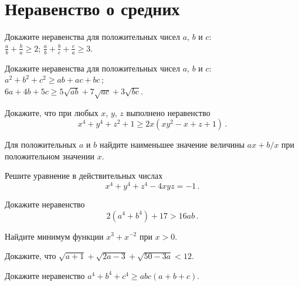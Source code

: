 
\section*{Неравенство о средних}


\begin{problems}

\item
Докажите неравенства для положительных чисел $a$, $b$ и $c$:
\\[0.5ex]
\subproblem
\( \displaystyle
    \frac{a}{b} + \frac{b}{a}
\geq
    2
\);
\qquad
\subproblem
\( \displaystyle
    \frac{a}{b} + \frac{b}{c} + \frac{c}{a}
\geq
    3
\).

\item
Докажите неравенства для положительных чисел $a$, $b$ и $c$:
\\[0.25ex]
\subproblem
\(
    a^2 + b^2 + c^2
\geq
    ab + ac + bc
\)\,;
\\[0.5ex]
\subproblem
\(
    6 a + 4 b + 5 c
\geq
    5 \sqrt{ab} + 7 \sqrt{ac} + 3 \sqrt{bc}
\).

\item
Докажите, что при любых $x$, $y$, $z$ выполнено неравенство
\[
    x^4 + y^4 + z^2 + 1
\geq
    2 x (x y^2 - x + z + 1)
\, . \]

\item
Для положительных $a$ и $b$ найдите наименьшее значение величины
$a x + b / x$
при положительном значении $x$.

\item
Решите уравнение в действительных числах
\[
    x^4 + y^4 + z^4 - 4 x y z = -1
\, . \]

\item
Докажите неравенство
\[
    2 (a^4 + b^4) + 17 > 16 a b
\, . \]


\item
Найдите минимум функции $x^3 + x^{-2}$ при $x > 0$.

\item
Докажите, что $\sqrt{a + 1} + \sqrt{2 a - 3} + \sqrt{50 - 3 a} < 12$.

\item
Докажите неравенство $a^4 + b^4 + c^4 \geq a b c (a + b + c)$.

\end{problems}

